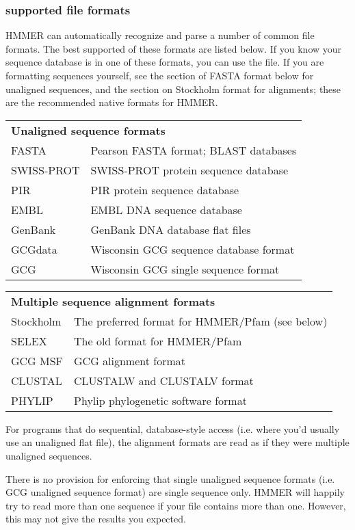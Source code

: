 \subsubsection{supported file formats}
 
HMMER can automatically recognize and parse a number of common file
formats. The best supported of these formats are listed below. If you
know your sequence database is in one of these formats, you can use
the file. If you are formatting sequences yourself, see the section of
FASTA format below for unaligned sequences, and the section on
Stockholm format for alignments; these are the recommended native
formats for HMMER.

\begin{tabular}{ll}
\multicolumn{2}{l}{\textbf{Unaligned sequence formats}} \\
FASTA      & Pearson FASTA format; BLAST databases \\
SWISS-PROT & SWISS-PROT protein sequence database\\ 
PIR        & PIR protein sequence database \\
EMBL       & EMBL DNA sequence database \\
GenBank    & GenBank DNA database flat files\\
GCGdata    & Wisconsin GCG sequence database format \\
GCG        & Wisconsin GCG single sequence format \\
\end{tabular}

\begin{tabular}{ll}
\multicolumn{2}{l}{\textbf{Multiple sequence alignment formats}}\\
Stockholm & The preferred format for HMMER/Pfam (see below)\\
SELEX     & The old format for HMMER/Pfam\\
GCG MSF   &   GCG alignment format \\
CLUSTAL   &   CLUSTALW and CLUSTALV format \\
PHYLIP    &   Phylip phylogenetic software format \\
\end{tabular}

For programs that do sequential, database-style access (i.e.  where
you'd usually use an unaligned flat file), the alignment formats are
read as if they were multiple unaligned sequences.

There is no provision for enforcing that single unaligned sequence
formats (i.e. GCG unaligned sequence format) are single sequence
only. HMMER will happily try to read more than one sequence if your
file contains more than one. However, this may not give the results
you expected.

